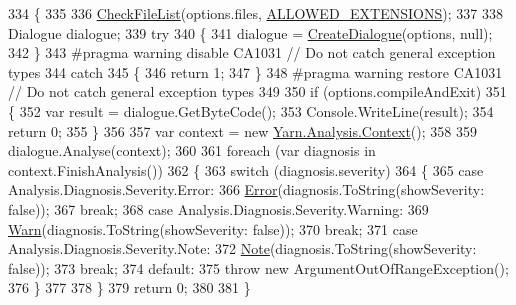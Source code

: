 \begin{DoxyCode}
334         \{
335 
336             \hyperlink{a00172_ad77564b25725a771f0fd4da430582e6f}{CheckFileList}(options.files, \hyperlink{a00172_a0979de7ea02c8c0375b8220a12e6575e}{ALLOWED\_EXTENSIONS});
337 
338             Dialogue dialogue;
339             \textcolor{keywordflow}{try}
340             \{
341                 dialogue = \hyperlink{a00172_aab244361a510cee18ad2f636d110e0d5}{CreateDialogue}(options, null);
342             \}
343 \textcolor{preprocessor}{#pragma warning disable CA1031 // Do not catch general exception types}
344 \textcolor{preprocessor}{}            \textcolor{keywordflow}{catch}
345             \{
346                 \textcolor{keywordflow}{return} 1;
347             \}
348 \textcolor{preprocessor}{#pragma warning restore CA1031 // Do not catch general exception types}
349 \textcolor{preprocessor}{}
350             \textcolor{keywordflow}{if} (options.compileAndExit)
351             \{
352                 var result = dialogue.GetByteCode();
353                 Console.WriteLine(result);
354                 \textcolor{keywordflow}{return} 0;
355             \}
356 
357             var context = \textcolor{keyword}{new} \hyperlink{a00054}{Yarn.Analysis.Context}();
358 
359             dialogue.Analyse(context);
360 
361             \textcolor{keywordflow}{foreach} (var diagnosis \textcolor{keywordflow}{in} context.FinishAnalysis())
362             \{
363                 \textcolor{keywordflow}{switch} (diagnosis.severity)
364                 \{
365                     \textcolor{keywordflow}{case} Analysis.Diagnosis.Severity.Error:
366                         \hyperlink{a00172_a2f63f9f5b7634cb50ee75ff2eb18b137}{Error}(diagnosis.ToString(showSeverity: \textcolor{keyword}{false}));
367                         \textcolor{keywordflow}{break};
368                     \textcolor{keywordflow}{case} Analysis.Diagnosis.Severity.Warning:
369                         \hyperlink{a00172_a979bb6f049b6c5294f745a19e24ddd9d}{Warn}(diagnosis.ToString(showSeverity: \textcolor{keyword}{false}));
370                         \textcolor{keywordflow}{break};
371                     \textcolor{keywordflow}{case} Analysis.Diagnosis.Severity.Note:
372                         \hyperlink{a00172_a939cc9e943c574b36c6af93e9c772702}{Note}(diagnosis.ToString(showSeverity: \textcolor{keyword}{false}));
373                         \textcolor{keywordflow}{break};
374                     \textcolor{keywordflow}{default}:
375                         \textcolor{keywordflow}{throw} \textcolor{keyword}{new} ArgumentOutOfRangeException();
376                 \}
377 
378             \}
379             \textcolor{keywordflow}{return} 0;
380 
381         \}
\end{DoxyCode}


